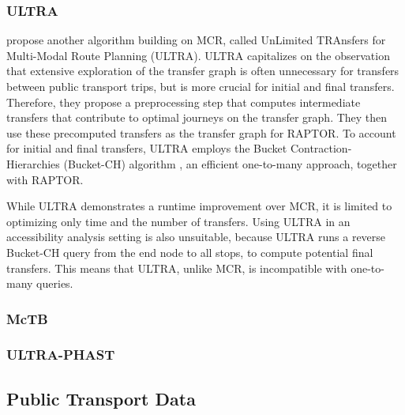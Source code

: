 \subsubsection{ULTRA}
\label{subsubsec:ultra}

\cite{baumUnLimitedTRAnsfersMultiModal2019} propose another algorithm building on MCR, called UnLimited TRAnsfers for Multi-Modal Route Planning (ULTRA).
ULTRA capitalizes on the observation that extensive exploration of the transfer graph is often unnecessary for transfers between public transport trips, but is more crucial for initial and final transfers.
Therefore, they propose a preprocessing step that computes intermediate transfers that contribute to optimal journeys on the transfer graph.
They then use these precomputed transfers as the transfer graph for RAPTOR.
To account for initial and final transfers, ULTRA employs the Bucket Contraction-Hierarchies (Bucket-CH) algorithm \cite{geisbergerContractionHierarchiesFaster2008}, an efficient one-to-many approach, together with RAPTOR.

While ULTRA demonstrates a runtime improvement over MCR, it is limited to optimizing only time and the number of transfers.
Using ULTRA in an accessibility analysis setting is also unsuitable, because ULTRA runs a reverse Bucket-CH query from the end node to all stops, to compute potential final transfers.
This means that ULTRA, unlike MCR, is incompatible with one-to-many queries.

\subsubsection{McTB}
\label{subsubsec:mctb}

\cite{potthoffFastMultimodalJourney2021}

\subsubsection{ULTRA-PHAST}
\label{subsubsec:ultra-phast}




\subsection{Public Transport Data}
\label{subsec:public_transport_data}

